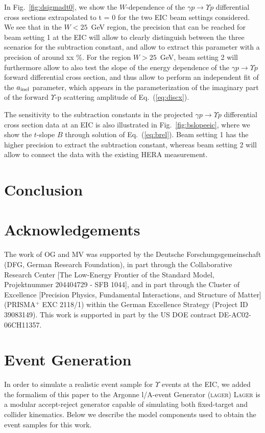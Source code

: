 \documentclass[prd,amsmath,%
twocolumn,floatfix,amssymb, preprintnumbers, linenumbers,nofootinbib, superscriptaddress]{revtex4}
\begin{document}
In Fig.~\ref{fig:dsigmadt0}, we show the $W$-dependence of the $\gamma p \to \Upsilon p$ differential cross sections extrapolated to t = 0 for the two EIC beam settings considered.  
We see that in the $W < 25$~GeV region, the precision that can be reached for beam setting 1 at the EIC will allow to clearly distinguish between the three scenarios for the subtraction constant, and allow to extract this parameter with a precision of around xx \%. For the region $W > 25$~GeV, beam setting 2 will furthermore allow to also test the slope of the energy dependence of the $\gamma p \to \Upsilon p$ forward differential cross section, and thus allow to perform an independent fit of the $a_{\rm inel}$ parameter, which appears in the parameterization of the imaginary part of the forward $\Upsilon$-p scattering amplitude of Eq.~(\ref{eq:discx}). 

The sensitivity to the subtraction constants in the 
projected $\gamma p \to \Upsilon p$ differential cross section data at an EIC is also illustrated in Fig.~\ref{fig:bslopeeic}, where we show the $t$-slope $B$ through solution of Eq.~(\ref{eq:brel}).  
Beam setting 1 has the higher precision to extract the subtraction constant, whereas beam setting 2 will allow to connect the data with the existing HERA measurement. 

\section{Conclusion}

\newpage


\section*{Acknowledgements}
The work of OG and MV was supported by the Deutsche Forschungsgemeinschaft (DFG, German Research Foundation),
in part through the Collaborative Research Center [The Low-Energy Frontier of the Standard
Model, Projektnummer 204404729 - SFB 1044], and in part through the Cluster of Excellence
[Precision Physics, Fundamental Interactions, and Structure of Matter] (PRISMA$^+$ EXC
2118/1) within the German Excellence Strategy (Project ID 39083149).
This work is supported in part by the US DOE contract DE-AC02-06CH11357.



\appendix

\section{Event Generation\label{apx-evgen}}
In order to simulate a realistic event sample for $\Upsilon$ events at the EIC,
we added the formalism of this paper to the Argonne l/A-event Generator (\textsc{lager}) \cite{git:lager}
\textsc{Lager} is a modular accept-reject generator capable of simulating both fixed-target and collider kinematics. Below we describe the model components used to obtain the event samples for this work.
\end{document}
